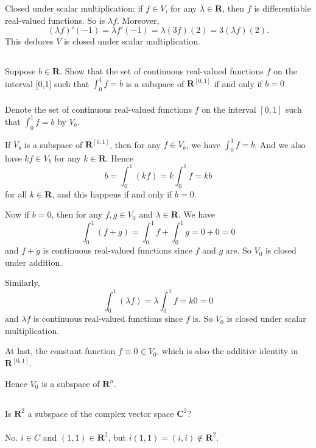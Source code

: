 \documentclass[a4paper]{article}
\begin{document}
Closed under scalar multiplication: if $f\in V$, for any $\lambda\in \mathbf{R}$, then $f$ is differentiable real-valued functions.
So is $\lambda f$. Moreover,
\[
    (\lambda f)'(-1)=\lambda f'(-1)=\lambda (3f)(2)=3(\lambda f)(2).
\]
This deduces $V$ is closed under scalar multiplication.

\subsection{}
Suppose $b \in \mathbf{R} .$ Show that the set of continuous real-valued functions $f$ on the interval [0,1] such that $\int_{0}^{1} f=b$ is a subspace of $\mathbf{R}^{[0,1]}$ if and only if $b=0$
\paragraph{}
Denote the set of continuous real-valued functions $f$ on the interval $[0,1]$ such that $\int_0^1f=b$ by $V_b$.

If $V_b$ is a subspace of $\mathbf{R}^{[0,1]}$, then for any $f \in V_b$, we have $\int_0^1f=b$.
And we also have $kf\in V_b$ for any $k\in \mathbf{R}$. Hence
\[
    b = \int_0^1(kf) = k\int_0^1f = kb
\]
for all $k\in \mathbf{R}$, and this happens if and only if $b = 0$.

Now if $b = 0$, then for any $f,g\in V_0$ and $\lambda \in \mathbf{R}$. We have
\[
    \int_0^1(f+g) = \int_0^1f+\int_0^1g = 0 + 0 = 0
\]
and $f+g$ is continuous real-valued functions since $f$ and $g$ are.
So $V_0$ is closed under addition.

Similarly,
\[
    \int_0^1(\lambda f) = \lambda\int_0^1 f = k0 = 0
\]
and $\lambda f$ is continuous real-valued functions since $f$ is.
So $V_0$ is closed under scalar multiplication.

At last, the constant function $f \equiv 0 \in V_0$, which is also the additive identity in $\mathbf{R}^{[0,1]}$.

Hence $V_0$ is a subspace of $\mathbf {R}^n$.

\subsection{}
Is $\mathbf{R}^{2}$ a subspace of the complex vector space $\mathbf{C}^{2} ?$
\paragraph{}
No. $i \in C$ and $(1, 1)\in \mathbf{R}^{2}$, but $i(1,1) = (i,i)\notin \mathbf{R}^{2}$.
\end{document}
